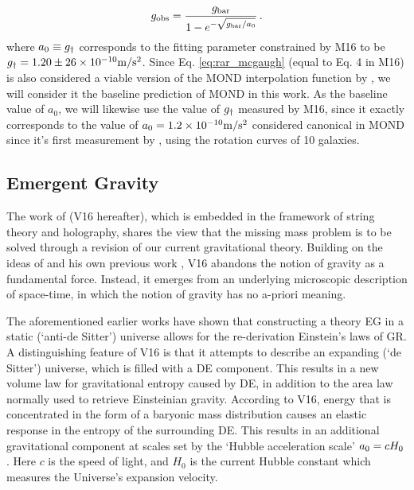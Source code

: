 \documentclass[usenatbib]{mnras}
\newcommand{\mpss}{ {\rm m/s^2} }
\newcommand*{\E}[1]{\times 10^{#1}}
\newcommand{\un}[1]{_{\rm #1}}
\begin{document}
\begin{equation}\label{eq:rar_mcgaugh}
	g\un{obs} = \frac{g\un{bar}}{1 - e^{-\sqrt{g\un{bar}/a_0}}} \, .
\end{equation}
where $a_0 \equiv g\un{\dagger}$ corresponds to the fitting parameter constrained by M16 to be $g\un{\dagger}=1.20\pm26\E{-10} \mpss$. Since Eq. \ref{eq:rar_mcgaugh} (equal to Eq. 4 in M16) is also considered a viable version of the MOND interpolation function by \cite{milgrom2008}, we will consider it the baseline prediction of MOND in this work. As the baseline value of $a_0$, we will likewise use the value of $g\un{\dagger}$ measured by M16, since it exactly corresponds to the value of $a_0=1.2\E{-10} \mpss$ considered canonical in MOND since it's first measurement by \cite{begeman1991}, using the rotation curves of 10 galaxies.

\subsection{Emergent Gravity}
\label{sec:EG}

The work of \cite{verlinde2016} (V16 hereafter), which is embedded in the framework of string theory and holography, shares the view that the missing mass problem is to be solved through a revision of our current gravitational theory. Building on the ideas of \cite{jacobson1995,jacobson2016,padmanabhan2010,faulkner2015} and his own previous work \cite[]{verlinde2011}, V16 abandons the notion of gravity as a fundamental force. Instead, it emerges from an underlying microscopic description of space-time, in which the notion of gravity has no a-priori meaning.

The aforementioned earlier works have shown that constructing a theory EG in a static (`anti-de Sitter') universe allows for the re-derivation Einstein's laws of GR. A distinguishing feature of V16 is that it attempts to describe an expanding (`de Sitter') universe, which is filled with a DE component. This results in a new volume law for gravitational entropy caused by DE, in addition to the area law normally used to retrieve Einsteinian gravity. According to V16, energy that is concentrated in the form of a baryonic mass distribution causes an elastic response in the entropy of the surrounding DE. This results in an additional gravitational component at scales set by the `Hubble acceleration scale' $a\un{0} = c H_0$. Here $c$ is the speed of light, and $H_0$ is the current Hubble constant which measures the Universe's expansion velocity.
\end{document}
